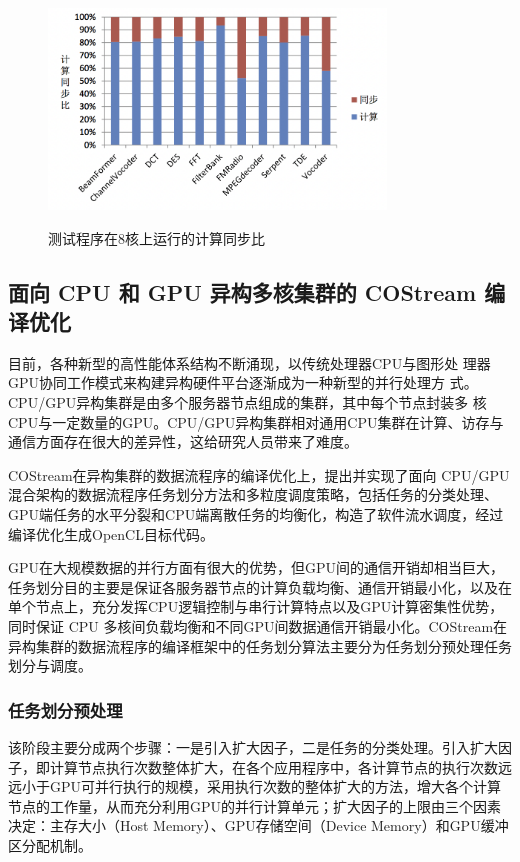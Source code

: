 \begin{figure}[htbp]
  \centering
  \includegraphics[width=0.8\textwidth]{Img/Chap_Application/Yu/x86computeSync.png}\\
  \caption{测试程序在8核上运行的计算同步比}\label{fig:x86computeSync}
\end{figure}

\subsection{面向 CPU 和 GPU 异构多核集群的 COStream 编译优化}

目前，各种新型的高性能体系结构不断涌现，以传统处理器CPU与图形处 理器GPU协同工作模式来构建异构硬件平台逐渐成为一种新型的并行处理方 式。CPU/GPU异构集群是由多个服务器节点组成的集群，其中每个节点封装多 核CPU与一定数量的GPU。CPU/GPU异构集群相对通用CPU集群在计算、访存与通信方面存在很大的差异性，这给研究人员带来了难度。 

COStream在异构集群的数据流程序的编译优化上，提出并实现了面向 CPU/GPU混合架构的数据流程序任务划分方法和多粒度调度策略，包括任务的分类处理、GPU端任务的水平分裂和CPU端离散任务的均衡化，构造了软件流水调度，经过编译优化生成OpenCL目标代码。

GPU在大规模数据的并行方面有很大的优势，但GPU间的通信开销却相当巨大，任务划分目的主要是保证各服务器节点的计算负载均衡、通信开销最小化，以及在单个节点上，充分发挥CPU逻辑控制与串行计算特点以及GPU计算密集性优势，同时保证 CPU 多核间负载均衡和不同GPU间数据通信开销最小化。COStream在异构集群的数据流程序的编译框架中的任务划分算法主要分为任务划分预处理任务划分与调度。

\subsubsection{任务划分预处理}
该阶段主要分成两个步骤：一是引入扩大因子，二是任务的分类处理。引入扩大因子，即计算节点执行次数整体扩大，在各个应用程序中，各计算节点的执行次数远远小于GPU可并行执行的规模，采用执行次数的整体扩大的方法，增大各个计算节点的工作量，从而充分利用GPU的并行计算单元；扩大因子的上限由三个因素决定：主存大小（Host Memory）、GPU存储空间（Device Memory）和GPU缓冲区分配机制。

